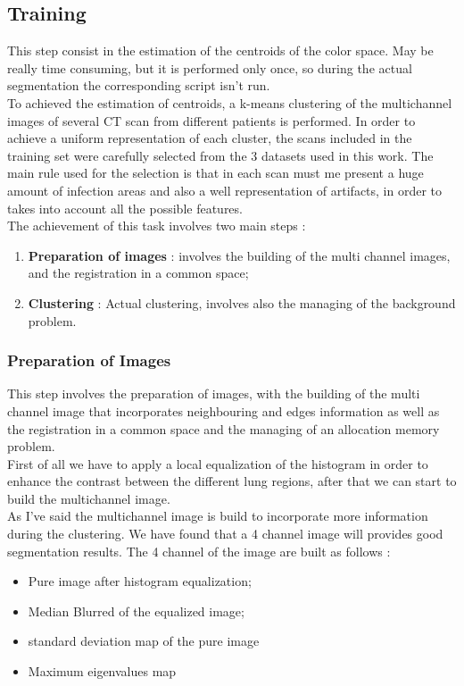 
	
	\subsection{Training}
	
	This step consist in the estimation of the centroids of the color space. May be  really time consuming, but it is performed only once, so during the actual segmentation the corresponding script isn't run.\\
	To achieved the estimation of centroids, a k-means clustering of the multichannel images of several CT scan from different patients is performed. 
	In order to achieve a uniform representation of each cluster, the scans included in the training set were carefully selected from the $3$ datasets used in this work. The main rule used for the selection is that in each scan must me present a huge amount of infection areas and also a well representation of artifacts, in order to takes into account all the possible features.\\
	The achievement of this task involves two main steps : 
	\begin{enumerate}
		\item \textbf{Preparation of images} : involves the building of the multi channel images, and the registration in a common space; 
		
		\item \textbf{Clustering} : Actual clustering, involves also the managing of the background problem.
	\end{enumerate}

		\subsubsection*{Preparation of Images} 
	
		This step involves the preparation of images, with the building of the multi channel image that incorporates neighbouring and edges information as well as the registration in a common space and the managing of an allocation memory problem.\\
		
		First of all we have to apply a local equalization of the histogram in order to enhance the contrast between the different lung regions, after that we can start to build the multichannel image.\\		
		As I've said the multichannel image is build to incorporate more information during the clustering. We have found that a 4 channel image will provides good segmentation results. The 4 channel of the image are built as follows  : 
		\begin{itemize}
			\item Pure image after histogram equalization; 
			\item Median Blurred of the equalized image; 
			\item standard deviation map of the pure image
			\item Maximum eigenvalues map 
		\end{itemize}
	
